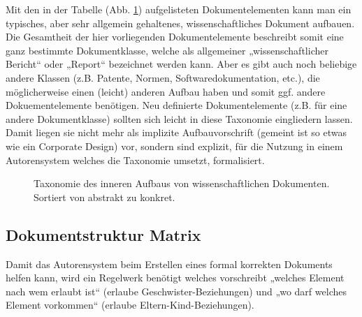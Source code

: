  
Mit den in der Tabelle (Abb. \ref{taxonomie}) aufgelisteten Dokumentelementen kann man ein typisches, aber sehr allgemein gehaltenes, wissenschaftliches Dokument aufbauen. Die Gesamtheit der hier vorliegenden Dokumentelemente beschreibt somit eine ganz bestimmte Dokumentklasse, welche als allgemeiner „wissenschaftlicher Bericht“ oder „Report“ bezeichnet werden kann. Aber es gibt auch noch beliebige andere Klassen (z.B. Patente, Normen, Softwaredokumentation, etc.), die möglicherweise einen (leicht) anderen Aufbau haben und somit ggf. andere Dokuementelemente benötigen. Neu definierte Dokumentelemente (z.B. für eine andere Dokumentklasse) sollten sich leicht in diese Taxonomie eingliedern lassen. Damit liegen sie nicht mehr als implizite Aufbauvorschrift (gemeint ist so etwas wie ein Corporate Design) vor, sondern sind explizit, für die Nutzung in einem Autorensystem welches die Taxonomie umsetzt, formalisiert.

 
\begin{figure}[h!]
\centering
\advance\leftskip-2.5cm
\caption{ Taxonomie des inneren Aufbaus von wissenschaftlichen Dokumenten. Sortiert von abstrakt zu konkret. }\label{taxonomie}
\end{figure}
 
\subsection{Dokumentstruktur Matrix}\label{}
 
Damit das Autorensystem beim Erstellen eines formal korrekten Dokuments helfen kann, wird ein Regelwerk benötigt welches vorschreibt „welches Element nach wem erlaubt ist“ (erlaube Geschwister-Beziehungen) und „wo darf welches Element vorkommen“ (erlaube Eltern-Kind-Beziehungen).

